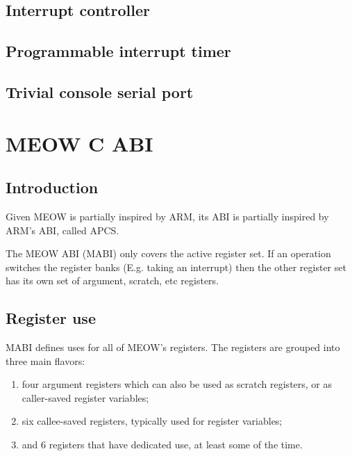 \documentclass[a4paper,twoside,openany]{book}
\begin{document}
    \section{Interrupt controller}
    \section{Programmable interrupt timer}
    \section{Trivial console serial port}
    
  \chapter{MEOW C ABI}
    \section{Introduction}
      Given MEOW is partially inspired by ARM, its ABI is partially inspired by
      ARM's ABI, called APCS.

      The MEOW ABI (MABI) only covers the active register set. If an operation
      switches the register banks (E.g. taking an interrupt) then the other
      register set has its own set of argument, scratch, etc registers.
    
    \section{Register use}
      MABI defines uses for all of MEOW's registers.  The registers are grouped
      into three main flavors:
      \begin{enumerate}
        \item four argument registers which can also be used as scratch 
          registers, or as caller-saved register variables;
        \item six callee-saved registers, typically used for register variables;
        \item and 6 registers that have dedicated use, at least some of
          the time.
      \end{enumerate}
      
\end{document}
